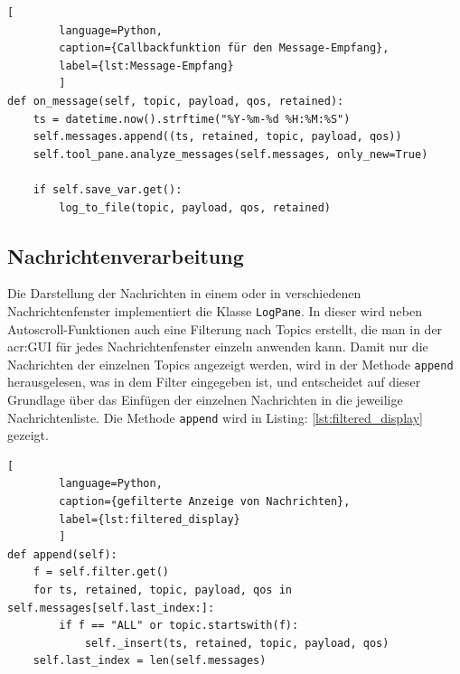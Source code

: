         \begin{lstlisting}[
        language=Python,
        caption={Callbackfunktion für den Message-Empfang},
        label={lst:Message-Empfang}
        ]
def on_message(self, topic, payload, qos, retained):
    ts = datetime.now().strftime("%Y-%m-%d %H:%M:%S")
    self.messages.append((ts, retained, topic, payload, qos))
    self.tool_pane.analyze_messages(self.messages, only_new=True)

    if self.save_var.get():
        log_to_file(topic, payload, qos, retained) \end{lstlisting}

    \subsection{Nachrichtenverarbeitung}
        Die Darstellung der Nachrichten in einem oder in verschiedenen Nachrichtenfenster implementiert die Klasse \lstinline{LogPane}. In dieser wird neben Autoscroll-Funktionen auch eine Filterung nach Topics erstellt, die man in der \acrshort{acr:GUI} für jedes Nachrichtenfenster einzeln anwenden kann. Damit nur die Nachrichten der einzelnen Topics angezeigt werden, wird in der Methode \lstinline{append} herausgelesen, was in dem Filter eingegeben ist, und entscheidet auf dieser Grundlage über das Einfügen der einzelnen Nachrichten in die jeweilige Nachrichtenliste. Die Methode \lstinline{append} wird in Listing: \ref{lst:filtered_display} gezeigt.
        \begin{lstlisting}[
        language=Python, 
        caption={gefilterte Anzeige von Nachrichten},
        label={lst:filtered_display}
        ]
def append(self):
    f = self.filter.get()
    for ts, retained, topic, payload, qos in self.messages[self.last_index:]:
        if f == "ALL" or topic.startswith(f):
            self._insert(ts, retained, topic, payload, qos)
    self.last_index = len(self.messages) \end{lstlisting}

